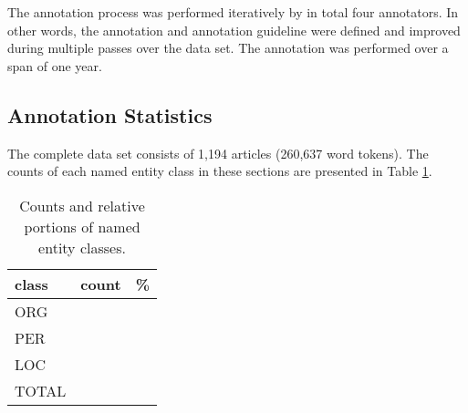 \documentclass[11pt]{article}
\begin{document}
The annotation process was performed iteratively by in total four annotators. In other words, the annotation and annotation guideline were defined and improved during multiple passes over the data set. The annotation was performed over a span of one year.





\subsection{Annotation Statistics}
\label{sec: annotation statistics}

 
The complete data set consists of 1,194 articles (260,637 word tokens). The counts of each named entity class in these sections are presented in Table \ref{tab: statistics}.

\begin{table}[h!]
\begin{center}
\begin{tabular}{lcc} 
\hline
\noalign{\smallskip}
class & count & \% \\ 
\hline
\noalign{\smallskip}
ORG & &  \\
PER & &  \\
LOC &  &   \\
\hline
\noalign{\smallskip}
TOTAL &  &  \\
\end{tabular}
\end{center}
\caption{Counts and relative portions of named entity classes.}
\label{tab: statistics} 
\end{table}
\end{document}
